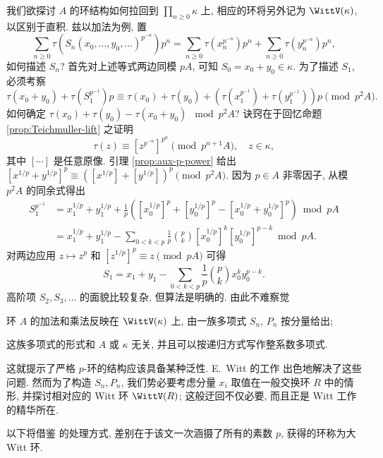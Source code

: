 我们欲探讨 $A$ 的环结构如何拉回到 $\prod_{n \geq 0} \kappa$ 上, 相应的环将另外记为 $\WittV(\kappa)$, 以区别于直积. 兹以加法为例, 置
\[ \sum_{n \geq 0} \tau\left( S_n(x_0, \ldots, y_0, \ldots)^{p^{-n}} \right) p^n = \sum_{n \geq 0} \tau(x_n^{p^{-n}}) p^n + \sum_{n \geq 0} \tau(y_n^{p^{-n}}) p^n, \]
如何描述 $S_n$? 首先对上述等式两边同模 $pA$, 可知 $S_0 = x_0 + y_0 \in \kappa$. 为了描述 $S_1$, 必须考察
\[ \tau(x_0 + y_0) + \tau( S_1^{p^{-1}} )p \equiv \tau(x_0) + \tau(y_0) + \left( \tau(x_1^{p^{-1}}) + \tau(y_1^{p^{-1}}) \right)p \pmod{p^2 A}. \]
如何确定 $\tau(x_0) + \tau(y_0) - \tau(x_0+y_0)\; \bmod p^2 A$? 诀窍在于回忆命题 \ref{prop:Teichmuller-lift} 之证明
\begin{equation}\label{eqn:Teich-lifting-power}
	\tau(z) \equiv \left[ z^{p^{-n}} \right]^{p^n} \pmod{ p^{n+1} A}, \quad z \in \kappa,
\end{equation}
其中 $[\cdots]$ 是任意原像. 引理 \ref{prop:aux-p-power} 给出 $[x^{1/p} + y^{1/p}]^p \equiv \left( [x^{1/p}] + [y^{1/p}] \right)^p \pmod {p^2 A}$. 因为 $p \in A$ 非零因子, 从模 $p^2 A$ 的同余式得出
\begin{align*}
	S_1^{p^{-1}} & = x_1^{1/p} + y_1^{1/p} + \frac{1}{p} \left( \left[ x_0^{1/p} \right]^p + \left[ y_0^{1/p} \right]^p - \left[ x_0^{1/p} + y_0^{1/p} \right]^p \right) \bmod pA \\
	& = x_1^{1/p} + y_1^{1/p} - \sum_{0 < k < p} \frac{1}{p} \binom{p}{k} \left[ x_0^{1/p} \right]^k \left[ y_0^{1/p} \right]^{p-k} \bmod pA.
\end{align*}
对两边应用 $z \mapsto z^p$ 和 $\left[ z^{1/p} \right]^p \equiv z \pmod {pA}$ 可得
\[ S_1 = x_1 + y_1 - \sum_{0 < k < p} \frac{1}{p} \binom{p}{k} x_0^k y_0^{p-k}. \]
高阶项 $S_2, S_3, \ldots$ 的面貌比较复杂, 但算法是明确的. 由此不难察觉
\begin{compactitem}
	\item 环 $A$ 的加法和乘法反映在 $\WittV(\kappa)$ 上, 由一族多项式 $S_n$, $P_n$ 按分量给出;
	\item 这族多项式的形式和 $A$ 或 $\kappa$ 无关, 并且可以按递归方式写作整系数多项式.
\end{compactitem}
这就提示了严格 $p$-环的结构应该具备某种泛性. E.\ Witt 的工作 \cite{Witt37} 出色地解决了这些问题. 然而为了构造 $S_n, P_n$, 我们势必要考虑分量 $x_i$ 取值在一般交换环 $R$ 中的情形, 并探讨相对应的 Witt 环 $\WittV(R)$; 这般迂回不仅必要, 而且正是 Witt 工作的精华所在.

以下将借鉴 \cite[\S 1]{Hess15} 的处理方式, 差别在于该文一次涵摄了所有的素数 $p$, 获得的环称为大 Witt 环.

